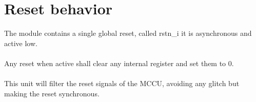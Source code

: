 \section{Reset behavior}

The module contains a single global reset, called rstn\_i it is asynchronous and active low.\\
\\
Any reset when active shall clear any internal register and set them to 0.\\
\\
This unit will filter the reset signals of the MCCU, avoiding any glitch but making the reset synchronous. 




